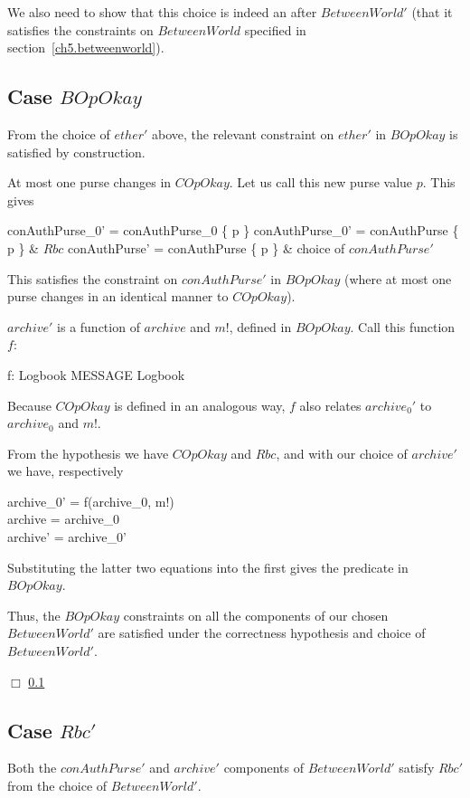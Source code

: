 We also need to show that this choice is indeed an after
$BetweenWorld'$ (that it satisfies the constraints on $BetweenWorld$
specified in section~\ref{ch5.betweenworld}).
\subsection{Case $BOpOkay$}
\label{bc-bop}
From the choice of $ether'$ above, the relevant constraint on
$ether'$ in $BOpOkay$ is satisfied by construction.

At most one purse changes in $COpOkay$.  Let us call this new purse
value $p$.  This gives
\begin{argue}
  conAuthPurse_0' = conAuthPurse_0 \oplus \{ p \}
  \also %
  conAuthPurse_0' = conAuthPurse \oplus \{ p \} & $Rbc$
  \also %
  conAuthPurse' = conAuthPurse \oplus \{ p \} & choice of
  $conAuthPurse'$
\end{argue}
This satisfies the constraint on $conAuthPurse'$ in $BOpOkay$ (where
at most one purse changes in an identical manner to $COpOkay$).

$archive'$ is a function of $archive$ and $m!$, defined in
$BOpOkay$. Call this function $f$:
\begin{gaxdef}
  f: Logbook \cross MESSAGE \fun Logbook
\end{gaxdef}
Because $COpOkay$ is defined in an analogous way, $f$ also relates
$archive_0'$ to $archive_0$ and $m!$.

From the hypothesis we have $COpOkay$ and $Rbc$, and with our choice
of $archive'$ we have, respectively
\begin{gzed}
  archive_0' = f(archive_0, m!)
  \\ %
  \land archive = archive_0
  \\ %
  \land archive' = archive_0'
\end{gzed}
Substituting the latter two equations into the first gives the
predicate in $BOpOkay$.

Thus, the $BOpOkay$ constraints on all the components of our chosen
$BetweenWorld'$ are satisfied under the correctness hypothesis and
choice of $BetweenWorld'$.

$\Box$ \ref{bc-bop}
\subsection{Case $Rbc'$}
\label{bc-rbc-dash}
Both the $conAuthPurse'$ and $archive'$ components of
$BetweenWorld'$ satisfy $Rbc'$ from the choice of $BetweenWorld'$.

